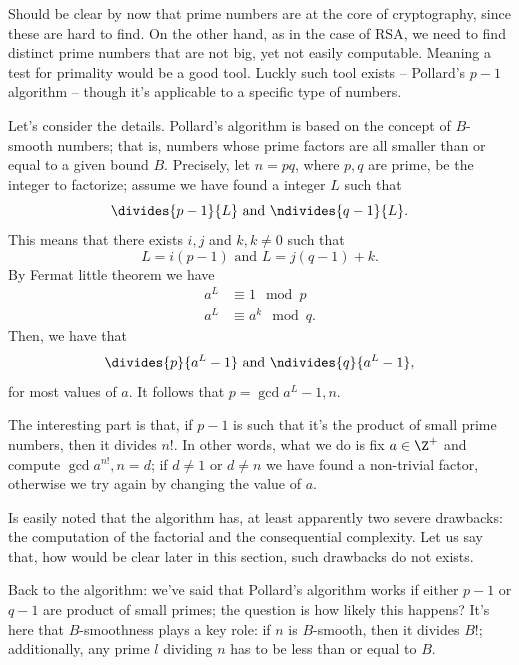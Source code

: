 \documentclass{subfiles}
\begin{document}
    Should be clear by now that prime numbers are at the core of cryptography,
        since these are hard to find\footnotemark. On the other hand,
        as in the case of RSA, we need to find distinct prime numbers 
        that are not big, yet not easily computable. 
        Meaning a test for primality would be a good tool.
        Luckly such tool exists -- Pollard's \(p - 1\) algorithm --
        though it's applicable to a specific type of numbers.

    Let's consider the details. Pollard's algorithm is based on the concept of 
        \(B\)-smooth numbers; that is, numbers whose prime factors are all smaller than 
        or equal to a given bound \(B\). Precisely, let \(n = pq\), where \(p, q\) are 
        prime, be the integer to factorize; assume we have found a integer \(L\)
        such that 
        \[
             \divides{p - 1}{L} \text{ and } \ndivides{q - 1}{L}.
        \]
        This means that there exists \(i, j\) and \(k, k \ne 0\) such that 
        \[
            L = i(p - 1) \text{ and } L = j(q - 1) + k.
        \]
        By Fermat little theorem we have 
        \[\begin{aligned}
            a^{L} & \equiv 1 \mod{p} \\ 
            a^{L} & \equiv a^{k} \mod{q}.
        \end{aligned}\]
        Then, we have that 
        \[
            \divides{p}{a^{L} - 1} \text{ and } \ndivides{q}{a^{L} - 1},
        \]
        for most values of \(a\). It follows that \(p = \gcd{a^{L} - 1, n}\).

    The interesting part is that, if \(p - 1\) is such that it's the product of small 
        prime numbers, then it divides \(n!\). In other words, what we do is 
        fix \(a \in \Z^{+}\) and compute \(\gcd{a^{n!}, n} = d\); if \(d \ne 1\) or 
        \(d \ne n\) we have found a non-trivial factor, otherwise we try again by changing the value 
        of \(a\).

    Is easily noted that the algorithm has, at least apparently two severe drawbacks: 
        the computation of the factorial and the consequential complexity. 
        Let us say that, how would be clear later in this section, such drawbacks do not exists.
    

    Back to the algorithm: we've said that Pollard's algorithm works if either \(p - 1\) or \(q - 1\)
        are product of small primes; the question is how likely this happens?
        It's here that \(B\)-smoothness plays a key role: if \(n\) is \(B\)-smooth,
        then it divides \(B!\); additionally, any prime \(l\) dividing \(n\) has to be less than or equal to \(B\).
\end{document}
